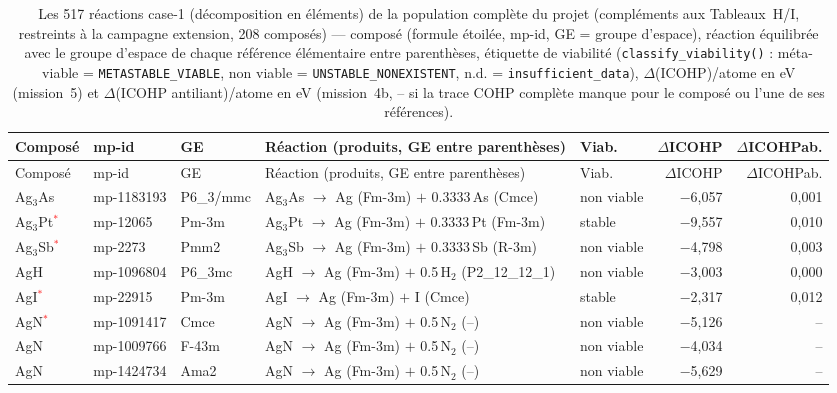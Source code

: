 \begin{longtable}{@{}ll l@{\hspace{4pt}} p{4.6cm} l@{\hspace{4pt}} rr@{}}
\caption{Les 517 réactions case-1 (décomposition en éléments) de la population complète du projet (compléments aux Tableaux~H/I, restreints à la campagne \og{}extension\fg{}, 208 composés) --- composé (formule étoilée, mp-id, GE = groupe d'espace), réaction équilibrée avec le groupe d'espace de chaque référence élémentaire entre parenthèses, étiquette de viabilité (\texttt{classify\_viability()} : m\'eta-viable = \texttt{METASTABLE\_VIABLE}, non viable = \texttt{UNSTABLE\_NONEXISTENT}, n.d. = \texttt{insufficient\_data}), $\Delta$(ICOHP)/atome en eV (mission~5) et $\Delta$(ICOHP antiliant)/atome en eV (mission~4b, \og{}--\fg{} si la trace COHP complète manque pour le composé ou l'une de ses références).}\\
\toprule
Composé & mp-id & GE & Réaction (produits, GE entre parenthèses) & Viab. & $\Delta$ICOHP & $\Delta$ICOHP\-ab. \\
\midrule
\endfirsthead
\toprule
Composé & mp-id & GE & Réaction (produits, GE entre parenthèses) & Viab. & $\Delta$ICOHP & $\Delta$ICOHP\-ab. \\
\midrule
\endhead
\bottomrule
\endfoot
\bottomrule
\endlastfoot
Ag$_{3}$As & mp-1183193 & P6\_3/mmc & Ag$_{3}$As $\to$ Ag (Fm-3m) $+$ 0.3333\,As (Cmce) & non viable & $-$6{,}057 & 0{,}001 \\
Ag$_{3}$Pt\textcolor{red}{$^*$} & mp-12065 & Pm-3m & Ag$_{3}$Pt $\to$ Ag (Fm-3m) $+$ 0.3333\,Pt (Fm-3m) & stable & $-$9{,}557 & 0{,}010 \\
Ag$_{3}$Sb\textcolor{red}{$^*$} & mp-2273 & Pmm2 & Ag$_{3}$Sb $\to$ Ag (Fm-3m) $+$ 0.3333\,Sb (R-3m) & non viable & $-$4{,}798 & 0{,}003 \\
AgH & mp-1096804 & P6\_3mc & AgH $\to$ Ag (Fm-3m) $+$ 0.5\,H$_{2}$ (P2\_12\_12\_1) & non viable & $-$3{,}003 & 0{,}000 \\
AgI\textcolor{red}{$^*$} & mp-22915 & Pm-3m & AgI $\to$ Ag (Fm-3m) $+$ I (Cmce) & stable & $-$2{,}317 & 0{,}012 \\
AgN\textcolor{red}{$^*$} & mp-1091417 & Cmce & AgN $\to$ Ag (Fm-3m) $+$ 0.5\,N$_{2}$ (--) & non viable & $-$5{,}126 & -- \\
AgN & mp-1009766 & F-43m & AgN $\to$ Ag (Fm-3m) $+$ 0.5\,N$_{2}$ (--) & non viable & $-$4{,}034 & -- \\
AgN & mp-1424734 & Ama2 & AgN $\to$ Ag (Fm-3m) $+$ 0.5\,N$_{2}$ (--) & non viable & $-$5{,}629 & -- \\

\end{longtable}
